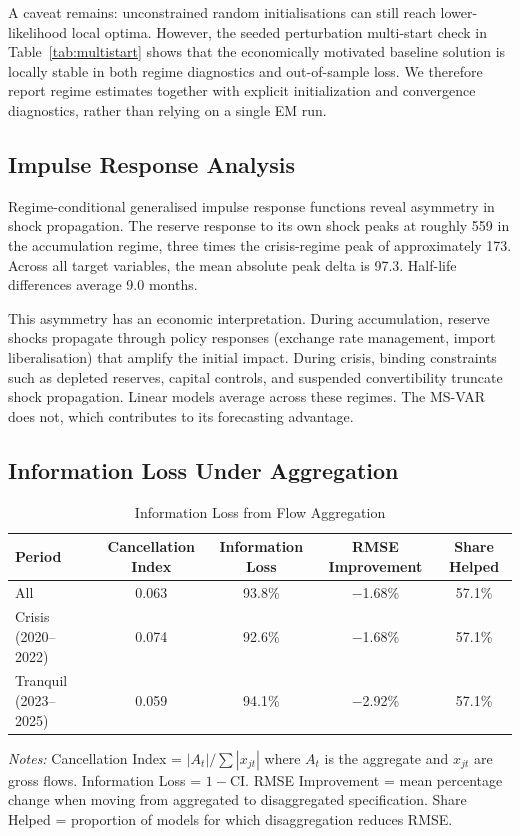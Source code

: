 \documentclass[12pt,a4paper]{article}
\begin{document}
A caveat remains: unconstrained random initialisations can still reach lower-likelihood local optima. However, the seeded perturbation multi-start check in Table~\ref{tab:multistart} shows that the economically motivated baseline solution is locally stable in both regime diagnostics and out-of-sample loss. We therefore report regime estimates together with explicit initialization and convergence diagnostics, rather than relying on a single EM run.

\subsection{Impulse Response Analysis}

Regime-conditional generalised impulse response functions reveal asymmetry in shock propagation. The reserve response to its own shock peaks at roughly 559 in the accumulation regime, three times the crisis-regime peak of approximately 173. Across all target variables, the mean absolute peak delta is 97.3. Half-life differences average 9.0 months.

This asymmetry has an economic interpretation. During accumulation, reserve shocks propagate through policy responses (exchange rate management, import liberalisation) that amplify the initial impact. During crisis, binding constraints such as depleted reserves, capital controls, and suspended convertibility truncate shock propagation. Linear models average across these regimes. The MS-VAR does not, which contributes to its forecasting advantage.

\subsection{Information Loss Under Aggregation}

\begin{table}[htbp]
\centering
\caption{Information Loss from Flow Aggregation}
\label{tab:info_loss}
\begin{tabular}{lcccc}
\toprule
Period & Cancellation Index & Information Loss & RMSE Improvement & Share Helped \\
\midrule
All & 0.063 & 93.8\% & $-$1.68\% & 57.1\% \\
Crisis (2020--2022) & 0.074 & 92.6\% & $-$1.68\% & 57.1\% \\
Tranquil (2023--2025) & 0.059 & 94.1\% & $-$2.92\% & 57.1\% \\
\bottomrule
\end{tabular}
\begin{tablenotes}
\small
\item \textit{Notes:} Cancellation Index = $|A_t|/\sum|x_{jt}|$ where $A_t$ is the aggregate and $x_{jt}$ are gross flows. Information Loss = $1 - \text{CI}$. RMSE Improvement = mean percentage change when moving from aggregated to disaggregated specification. Share Helped = proportion of models for which disaggregation reduces RMSE.
\end{tablenotes}
\end{table}
\end{document}
